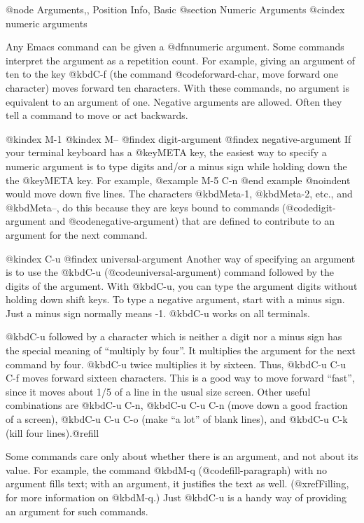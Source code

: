 {{{{{@node Arguments,, Position Info, Basic
@section Numeric Arguments
@cindex numeric arguments

  Any Emacs command can be given a @dfn{numeric argument}.  Some commands
interpret the argument as a repetition count.  For example, giving an
argument of ten to the key @kbd{C-f} (the command @code{forward-char}, move
forward one character) moves forward ten characters.  With these commands,
no argument is equivalent to an argument of one.  Negative arguments are
allowed.  Often they tell a command to move or act backwards.

@kindex M-1
@kindex M--
@findex digit-argument
@findex negative-argument
  If your terminal keyboard has a @key{META} key, the easiest way to
specify a numeric argument is to type digits and/or a minus sign while
holding down the the @key{META} key.  For example,
@example
M-5 C-n
@end example
@noindent
would move down five lines.  The characters @kbd{Meta-1}, @kbd{Meta-2},
etc., and @kbd{Meta--}, do this because they are keys bound to commands
(@code{digit-argument} and @code{negative-argument}) that are defined to
contribute to an argument for the next command.

@kindex C-u
@findex universal-argument
  Another way of specifying an argument is to use the @kbd{C-u}
(@code{universal-argument}) command followed by the digits of the argument.
With @kbd{C-u}, you can type the argument digits without holding
down shift keys.  To type a negative argument, start with a minus sign.
Just a minus sign normally means -1.  @kbd{C-u} works on all terminals.

  @kbd{C-u} followed by a character which is neither a digit nor a minus
sign has the special meaning of ``multiply by four''.  It multiplies the
argument for the next command by four.  @kbd{C-u} twice multiplies it by
sixteen.  Thus, @kbd{C-u C-u C-f} moves forward sixteen characters.  This
is a good way to move forward ``fast'', since it moves about 1/5 of a line
in the usual size screen.  Other useful combinations are @kbd{C-u C-n},
@kbd{C-u C-u C-n} (move down a good fraction of a screen), @kbd{C-u C-u
C-o} (make ``a lot'' of blank lines), and @kbd{C-u C-k} (kill four
lines).@refill

  Some commands care only about whether there is an argument, and not about
its value.  For example, the command @kbd{M-q} (@code{fill-paragraph}) with
no argument fills text; with an argument, it justifies the text as well.
(@xref{Filling}, for more information on @kbd{M-q}.)  Just @kbd{C-u} is a
handy way of providing an argument for such commands.

}}}}}
